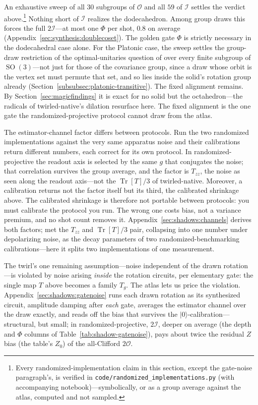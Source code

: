 \documentclass[11pt, oneside, openany]{scrbook}
\DeclareMathOperator{\SO}{SO}
\DeclareMathOperator{\Tr}{Tr}
\newcommand{\Ogroup}{\mathcal{O}}  %
\newcommand{\Igroup}{\mathcal{I}}  %
\newcommand{\TwoO}{2\Ogroup}
\newcommand{\TwoI}{2\Igroup}
\newcommand{\ket}[1]{|#1\rangle}
\begin{document}
An exhaustive sweep of all $30$ subgroups of $\Ogroup$ and all $59$ of $\Igroup$ settles the verdict above.\footnote{Every randomized-implementation claim in this section, except the gate-noise paragraph's, is verified in \texttt{code/randomized\_implementations.py} (with accompanying notebook)---symbolically, or as a group average against the atlas, computed and not sampled.} Nothing short of $\Igroup$ realizes the dodecahedron. Among group draws this forces the full $\TwoI$---at most one $\Phi$ per shot, $0.8$ on average (Appendix~\ref{sec:synthesis:doublecoset}). The golden gate $\Phi$ is strictly necessary in the dodecahedral case alone. For the Platonic case, the sweep settles the group-draw restriction of the optimal-unitaries question of \textcite[App.~D]{nguyen2022optimisingshadowtomography} over every finite subgroup of $\SO(3)$---not just for those of the covariance group, since a draw whose orbit is the vertex set must permute that set, and so lies inside the solid's rotation group already (Section~\ref{subsubsec:platonic-transitive}). The fixed alignment remains. By Section~\ref{sec:magicfindings} it is exact for no solid but the octahedron---the radicals of twirled-native's dilation resurface here. The fixed alignment is the one gate the randomized-projective protocol cannot draw from the atlas.

The estimator-channel factor differs between protocols. Run the two randomized implementations against the very same apparatus noise and their calibrations return different numbers, each correct for its own protocol. In randomized-projective the readout axis is selected by the same $g$ that conjugates the noise; that correlation survives the group average, and the factor is $T_{zz}$, the noise as seen along the readout axis---not the $\Tr[T]/3$ of twirled-native. Moreover, a calibration returns not the factor itself but its third, the calibrated shrinkage above. The calibrated shrinkage is therefore not portable between protocols: you must calibrate the protocol you run. The wrong one costs bias, not a variance premium, and no shot count removes it. Appendix~\ref{sec:shadows:channels} derives both factors; \textcite{onorati2024noisemitigatedrandomizedmeasurements} met the $T_{zz}$ and $\Tr[T]/3$ pair, collapsing into one number under depolarizing noise, as the decay parameters of two randomized-benchmarking calibrations---here it splits two implementations of one measurement.

The twirl's one remaining assumption---noise independent of the drawn rotation---is violated by noise arising \textit{inside} the rotation circuits, per elementary gate: the single map $T$ above becomes a family $T_g$. The atlas lets us price the violation. Appendix~\ref{sec:shadows:gatenoise} runs each drawn rotation as its synthesized circuit, amplitude damping after \textit{each} gate, averages the estimator channel over the draw exactly, and reads off the bias that survives the $\ket{0}$-calibration---structural, but small; in randomized-projective, $\TwoI$, deeper on average (the depth and $\Phi$ columns of Table~\ref{tab:shadow-gatenoise}), pays about twice the residual $Z$ bias (the table's $Z_0$) of the all-Clifford $\TwoO$.

\end{document}
